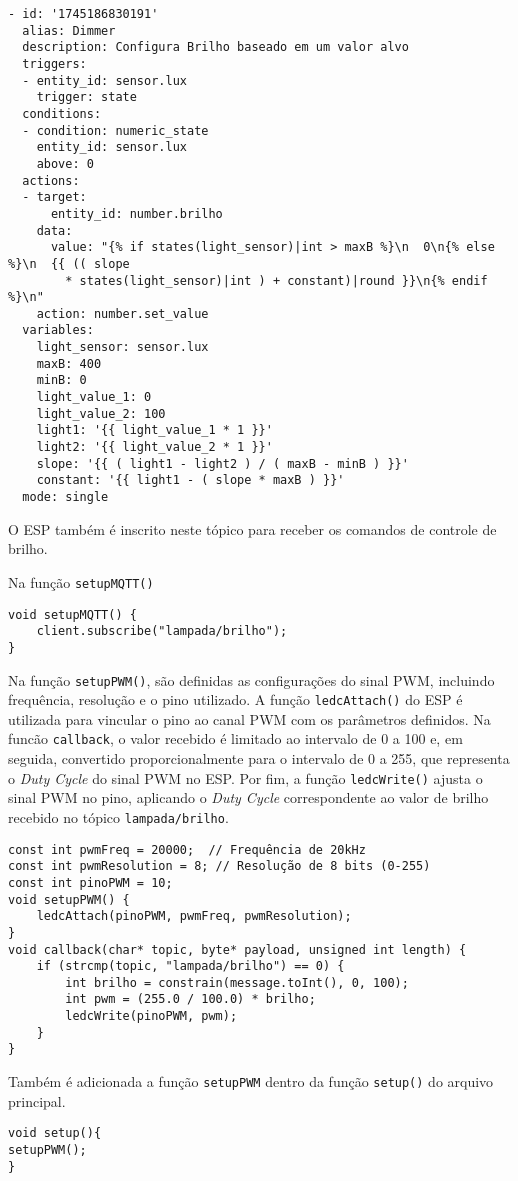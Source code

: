 \documentclass[]{abntex2}
\begin{document}
\begin{verbatim}
- id: '1745186830191'
  alias: Dimmer
  description: Configura Brilho baseado em um valor alvo
  triggers:
  - entity_id: sensor.lux
    trigger: state
  conditions:
  - condition: numeric_state
    entity_id: sensor.lux
    above: 0
  actions:
  - target:
      entity_id: number.brilho
    data:
      value: "{% if states(light_sensor)|int > maxB %}\n  0\n{% else %}\n  {{ (( slope
        * states(light_sensor)|int ) + constant)|round }}\n{% endif %}\n"
    action: number.set_value
  variables:
    light_sensor: sensor.lux
    maxB: 400
    minB: 0
    light_value_1: 0
    light_value_2: 100
    light1: '{{ light_value_1 * 1 }}'
    light2: '{{ light_value_2 * 1 }}'
    slope: '{{ ( light1 - light2 ) / ( maxB - minB ) }}'
    constant: '{{ light1 - ( slope * maxB ) }}'
  mode: single
\end{verbatim}

O ESP também é inscrito neste tópico para receber os comandos de controle de
brilho.

Na função \texttt{setupMQTT()}
\begin{verbatim}
void setupMQTT() {
	client.subscribe("lampada/brilho");
}
\end{verbatim}

Na função \texttt{setupPWM()}, são definidas as configurações do sinal PWM,
incluindo frequência, resolução e o pino utilizado.
A função \texttt{ledcAttach()} do ESP é utilizada para vincular o pino
ao canal PWM com os parâmetros definidos.
Na funcão \texttt{callback}, o valor recebido é limitado ao intervalo de 0 a 100 e, em seguida, convertido
proporcionalmente para o intervalo de 0 a 255, que representa o \textit{Duty
Cycle} do sinal PWM no ESP.
Por fim, a função \texttt{ledcWrite()} ajusta o sinal PWM no pino, aplicando o
\textit{Duty Cycle} correspondente ao valor de brilho recebido no tópico
\texttt{lampada/brilho}.

\begin{verbatim}
const int pwmFreq = 20000;  // Frequência de 20kHz
const int pwmResolution = 8; // Resolução de 8 bits (0-255)
const int pinoPWM = 10;
void setupPWM() {
	ledcAttach(pinoPWM, pwmFreq, pwmResolution);
}
void callback(char* topic, byte* payload, unsigned int length) {
	if (strcmp(topic, "lampada/brilho") == 0) {
		int brilho = constrain(message.toInt(), 0, 100);
		int pwm = (255.0 / 100.0) * brilho;
		ledcWrite(pinoPWM, pwm);
	}
}
\end{verbatim}
Também é adicionada a função \texttt{setupPWM} dentro da função
\texttt{setup()} do arquivo principal.
\begin{verbatim}
void setup(){
setupPWM();
}
\end{verbatim}
\end{document}
